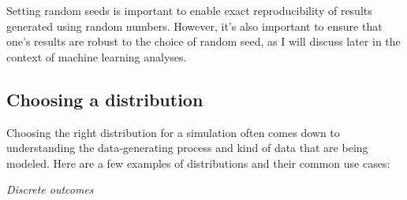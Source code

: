 Setting random seeds is important to enable exact reproducibility of results generated using random numbers. However, it's also important to ensure that one's results are robust to the choice of random seed, as I will discuss later in the context of machine learning analyses.

\subsection{Choosing a distribution}

Choosing the right distribution for a simulation often comes down to understanding the data-generating process and kind of data that are being modeled.  Here are a few examples of distributions and their common use cases:

\textit{Discrete outcomes}

